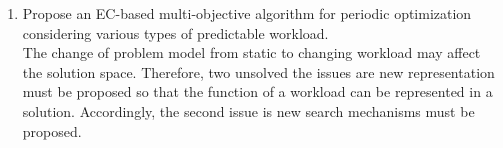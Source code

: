 \begin{enumerate}

	\item Propose an EC-based multi-objective algorithm for periodic optimization considering various types of predictable workload. \\
	 The change of problem model from static to changing workload may affect the solution space. Therefore, two unsolved the issues are new representation must be proposed so that the function of a workload can be represented in a solution. Accordingly, the second issue is new search mechanisms must be proposed.


	

	

	\end{enumerate}

